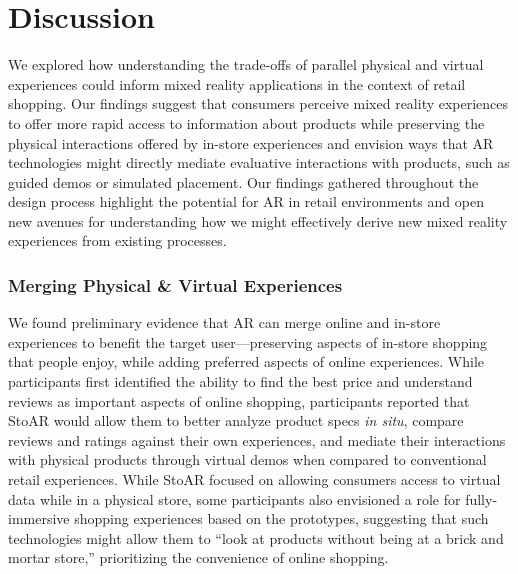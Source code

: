 \section{Discussion}
We explored how understanding the trade-offs of parallel physical and virtual experiences could inform mixed reality applications in the context of retail shopping.  Our findings suggest that consumers perceive mixed reality experiences to offer more rapid access to information about products while preserving the physical interactions offered by in-store experiences and envision ways that AR technologies might directly mediate evaluative interactions with products, such as guided demos or simulated placement.  
Our findings gathered throughout the design process highlight the potential for AR in retail environments and open new avenues for understanding how we might effectively derive new mixed reality experiences from existing processes. 

\subsubsection{Merging Physical \& Virtual Experiences}
We found preliminary evidence that AR can merge online and in-store experiences to benefit the target user---preserving aspects of in-store shopping that people enjoy, while adding preferred aspects of online experiences.  While participants first identified the ability to find the best price and understand reviews as important aspects of online shopping, participants reported that StoAR would allow them to better analyze product specs \emph{in situ}, compare reviews and ratings against their own experiences, and mediate their interactions with physical products through virtual demos when compared to conventional retail experiences.  While StoAR focused on allowing consumers access to virtual data while in a physical store, some participants also envisioned a role for fully-immersive shopping experiences based on the prototypes, suggesting that such technologies might allow them to ``look at products without being at a brick and mortar store,'' prioritizing the convenience of online shopping. 

